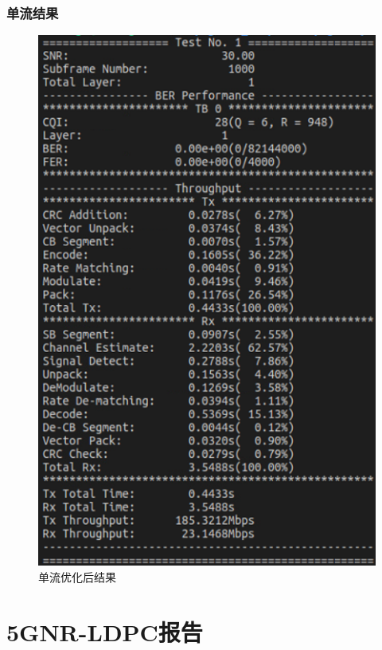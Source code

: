 \documentclass{article}
\begin{document}
\subsubsection{单流结果}
\begin{figure}[H]
	\centering
	\includegraphics[width = .4\textwidth]{now1.png}
	\caption{单流优化后结果}
\end{figure}

\section{5GNR-LDPC报告}


\end{document}
